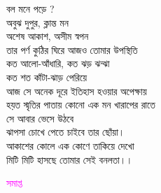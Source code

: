 \documentclass[12pt]{article}
\begin{document}
\noindent
বল মনে পড়ে ?\\
অবুঝ দুপুর, ক্লান্ত মন\\
অশেষ আকাশ, অসীম স্বপন\\
তার পর্ণ কুঠির ঘিরে আজও তোমার উপস্থিতি\\
কত আলো-আঁধারি, কত ঝড় ঝন্ঝা\\
কত শত কাঁটা-ঝাড় পেরিয়ে\\
আজ সে অনেক দূরে ইতিহাস হওয়ার অপেক্ষায়\\
হয়ত স্মৃতির পাতায় কোনো এক মন খারাপের রাতে\\
সে আবার ভেসে উঠবে\\
ঝাপসা চোখে পেতে চাইবে তার ছোঁয়া।\\
আকাশের কোলে এক কোণে তাকিয়ে দেখো\\
মিটি মিটি হাসছে তোমার সেই বনলতা।।

\newpage
\vspace{4in}
\begin{center}
  \textcolor{magenta}{\Huge সমাপ্ত}
\end{center}
\end{document}
